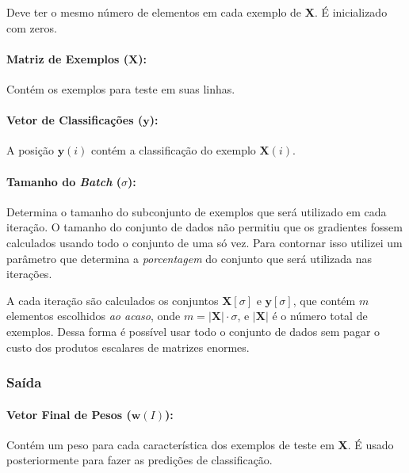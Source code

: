 \documentclass[a4paper, 12pt]{article}
\begin{document}
Deve ter o mesmo número de elementos em cada exemplo de \textbf{X}.
É inicializado com zeros.

\paragraph{Matriz de Exemplos ($\textbf{X}$):}

Contém os exemplos para teste em suas linhas.

\paragraph{Vetor de Classificações ($\textbf{y}$):}

A posição $\textbf{y}(i)$ contém a classificação
do exemplo $\textbf{X}(i)$.

\paragraph{Tamanho do \textit{Batch} ($\sigma$):}

Determina o tamanho do subconjunto de exemplos que será utilizado em cada
iteração. O tamanho do conjunto de dados não permitiu que os gradientes
fossem calculados usando todo o conjunto de uma só vez. Para contornar
isso utilizei um parâmetro que determina a \textit{porcentagem} do
conjunto que será utilizada nas iterações.

A cada iteração são calculados os conjuntos $\textbf{X}[\sigma]$ e
$\textbf{y}[\sigma]$, que contém $m$  elementos escolhidos \textit{ao acaso},
onde $m = |\textbf{X}| \cdot \sigma$, e $|\textbf{X}|$ é o número total de
exemplos.  Dessa forma é possível usar todo o conjunto de dados sem pagar o
custo dos produtos escalares de matrizes enormes.

\subsubsection{Saída}

\paragraph{Vetor Final de Pesos ($\textbf{w}(I)$):}

Contém um peso para cada característica dos exemplos de teste
em \textbf{X}. É usado posteriormente para fazer as predições
de classificação.
\end{document}
